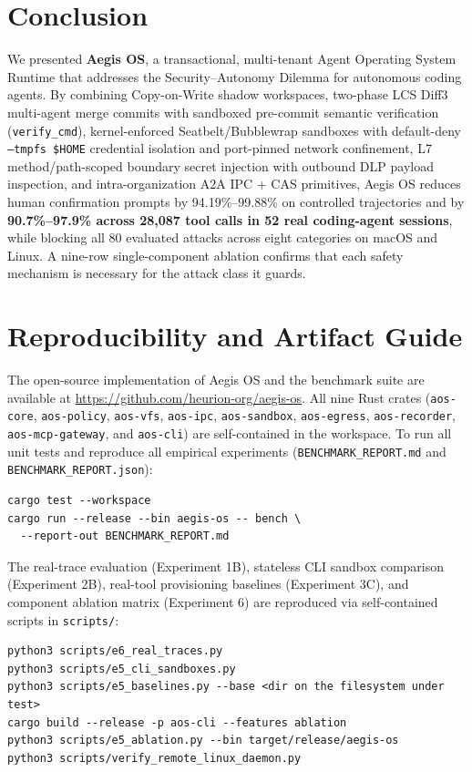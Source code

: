 \documentclass[acmsmall,screen,review]{acmart}
\begin{document}
\section{Conclusion}
\label{sec:conclusion}

We presented \textbf{Aegis OS}, a transactional, multi-tenant Agent Operating System Runtime that addresses the Security--Autonomy Dilemma for autonomous coding agents. By combining Copy-on-Write shadow workspaces, two-phase LCS Diff3 multi-agent merge commits with sandboxed pre-commit semantic verification (\texttt{verify\_cmd}), kernel-enforced Seatbelt/Bubblewrap sandboxes with default-deny \texttt{--tmpfs \$HOME} credential isolation and port-pinned network confinement, L7 method/path-scoped boundary secret injection with outbound DLP payload inspection, and intra-organization A2A IPC + CAS primitives, Aegis OS reduces human confirmation prompts by 94.19\%--99.88\% on controlled trajectories and by \textbf{90.7\%--97.9\% across 28,087 tool calls in 52 real coding-agent sessions}, while blocking all 80 evaluated attacks across eight categories on macOS and Linux. A nine-row single-component ablation confirms that each safety mechanism is necessary for the attack class it guards.




\appendix

\section{Reproducibility and Artifact Guide}
\label{sec:appendix}

The open-source implementation of Aegis OS and the benchmark suite are available at \url{https://github.com/heurion-org/aegis-os}. All nine Rust crates (\texttt{aos-core}, \texttt{aos-policy}, \texttt{aos-vfs}, \texttt{aos-ipc}, \texttt{aos-sandbox}, \texttt{aos-egress}, \texttt{aos-recorder}, \texttt{aos-mcp-gateway}, and \texttt{aos-cli}) are self-contained in the workspace. To run all unit tests and reproduce all empirical experiments (\texttt{BENCHMARK\_REPORT.md} and \texttt{BENCHMARK\_REPORT.json}):
\begin{lstlisting}
cargo test --workspace
cargo run --release --bin aegis-os -- bench \
  --report-out BENCHMARK_REPORT.md
\end{lstlisting}
The real-trace evaluation (Experiment 1B), stateless CLI sandbox comparison (Experiment 2B), real-tool provisioning baselines (Experiment 3C), and component ablation matrix (Experiment 6) are reproduced via self-contained scripts in \texttt{scripts/}:
\begin{lstlisting}
python3 scripts/e6_real_traces.py
python3 scripts/e5_cli_sandboxes.py
python3 scripts/e5_baselines.py --base <dir on the filesystem under test>
cargo build --release -p aos-cli --features ablation
python3 scripts/e5_ablation.py --bin target/release/aegis-os
python3 scripts/verify_remote_linux_daemon.py
\end{lstlisting}
\end{document}
